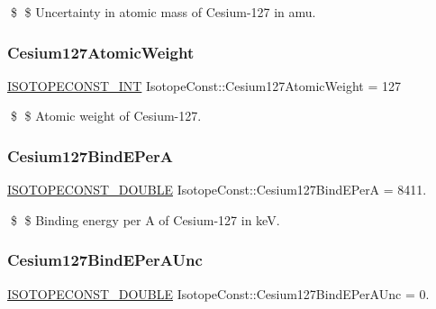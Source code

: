 \$ \$ Uncertainty in atomic mass of Cesium-\/127 in amu. \mbox{\label{group___isotope_const-_cesium-_cs127_ga980bb76a625c5f0e171bd129197ec5d7}} 
\subsubsection{\texorpdfstring{Cesium127\+Atomic\+Weight}{Cesium127AtomicWeight}}
{\footnotesize\ttfamily \mbox{\hyperlink{group___isotope_const-_macros_ga5f18360b3e99483a35c32d789e62621c}{I\+S\+O\+T\+O\+P\+E\+C\+O\+N\+S\+T\+\_\+\+I\+NT}} Isotope\+Const\+::\+Cesium127\+Atomic\+Weight = 127}

\$ \$ Atomic weight of Cesium-\/127. \mbox{\label{group___isotope_const-_cesium-_cs127_ga1c04e2816dec7ecba115c5f67e7c6d05}} 
\subsubsection{\texorpdfstring{Cesium127\+Bind\+E\+PerA}{Cesium127BindEPerA}}
{\footnotesize\ttfamily \mbox{\hyperlink{group___isotope_const-_macros_ga8f45a7272ce02c0b4c65c44636ed719a}{I\+S\+O\+T\+O\+P\+E\+C\+O\+N\+S\+T\+\_\+\+D\+O\+U\+B\+LE}} Isotope\+Const\+::\+Cesium127\+Bind\+E\+PerA = 8411.}

\$ \$ Binding energy per A of Cesium-\/127 in keV. \mbox{\label{group___isotope_const-_cesium-_cs127_gaee00214b4c2be5a7f016347642098a19}} 
\subsubsection{\texorpdfstring{Cesium127\+Bind\+E\+Per\+A\+Unc}{Cesium127BindEPerAUnc}}
{\footnotesize\ttfamily \mbox{\hyperlink{group___isotope_const-_macros_ga8f45a7272ce02c0b4c65c44636ed719a}{I\+S\+O\+T\+O\+P\+E\+C\+O\+N\+S\+T\+\_\+\+D\+O\+U\+B\+LE}} Isotope\+Const\+::\+Cesium127\+Bind\+E\+Per\+A\+Unc = 0.}

